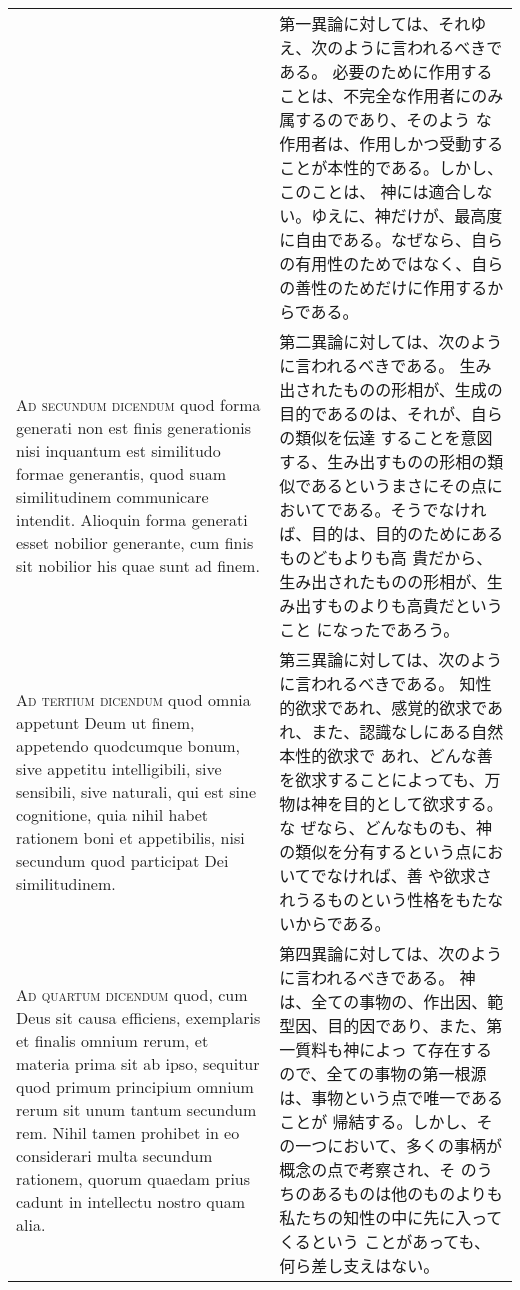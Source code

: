 \documentclass[10pt]{jsarticle} %
\begin{document}
\begin{longtable}{p{21em}p{21em}}
&


第一異論に対しては、それゆえ、次のように言われるべきである。
必要のために作用することは、不完全な作用者にのみ属するのであり、そのよう
 な作用者は、作用しかつ受動することが本性的である。しかし、このことは、
 神には適合しない。ゆえに、神だけが、最高度に自由である。なぜなら、自ら
 の有用性のためではなく、自らの善性のためだけに作用するからである。

\\


{\scshape Ad secundum dicendum} quod forma generati non
est finis generationis nisi inquantum est similitudo formae generantis,
quod suam similitudinem communicare intendit. Alioquin forma generati
esset nobilior generante, cum finis sit nobilior his quae sunt ad finem.

&

第二異論に対しては、次のように言われるべきである。
生み出されたものの形相が、生成の目的であるのは、それが、自らの類似を伝達
 することを意図する、生み出すものの形相の類似であるというまさにその点に
 おいてである。そうでなければ、目的は、目的のためにあるものどもよりも高
 貴だから、生み出されたものの形相が、生み出すものよりも高貴だということ
 になったであろう。

\\

{\scshape Ad tertium dicendum} quod omnia appetunt Deum
ut finem, appetendo quodcumque bonum, sive appetitu intelligibili, sive
sensibili, sive naturali, qui est sine cognitione, quia nihil habet
rationem boni et appetibilis, nisi secundum quod participat Dei
similitudinem.

&

第三異論に対しては、次のように言われるべきである。
知性的欲求であれ、感覚的欲求であれ、また、認識なしにある自然本性的欲求で
 あれ、どんな善を欲求することによっても、万物は神を目的として欲求する。な
 ぜなら、どんなものも、神の類似を分有するという点においてでなければ、善
 や欲求されうるものという性格をもたないからである。

\\


{\scshape Ad quartum dicendum} quod, cum Deus sit causa
efficiens, exemplaris et finalis omnium rerum, et materia prima sit ab
ipso, sequitur quod primum principium omnium rerum sit unum tantum
secundum rem. Nihil tamen prohibet in eo considerari multa secundum
rationem, quorum quaedam prius cadunt in intellectu nostro quam alia.


&

第四異論に対しては、次のように言われるべきである。
神は、全ての事物の、作出因、範型因、目的因であり、また、第一質料も神によっ
 て存在するので、全ての事物の第一根源は、事物という点で唯一であることが
 帰結する。しかし、その一つにおいて、多くの事柄が概念の点で考察され、そ
 のうちのあるものは他のものよりも私たちの知性の中に先に入ってくるという
 ことがあっても、何ら差し支えはない。

\end{longtable}
\end{document}
